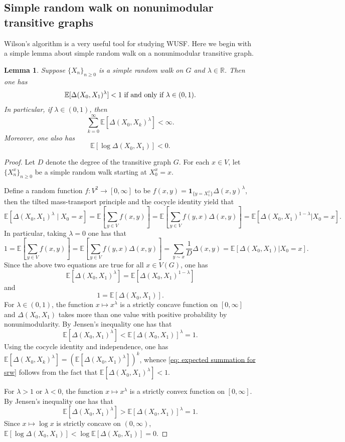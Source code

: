 \documentclass[12pt]{article}
\newtheorem{lemma}[theorem]{Lemma}
\numberwithin{equation}{section}
\newcommand{\be}{\begin{equation}}
\newcommand{\ee}{\end{equation}}
\newcommand{\1}{\mathbf{1}}
\begin{document}
 
 \subsection{Simple random walk on nonunimodular transitive graphs}
 Wilson's algorithm is a very useful tool for studying WUSF. Here we begin with a simple lemma about simple random walk on a nonunimodular transitive graph. 
 \begin{lemma}\label{lem:expectation for SRW on nonunimodular transitive graph}
 	Suppose $\{X_n\}_{n\geq0}$ is a simple random walk on $G$ and $\lambda\in\mathbb{R}$. Then one has 
 	\[
 	\mathbb{E}[\Delta(X_0,X_1)^\lambda]<1 \textnormal{ if and only if }\lambda\in(0,1).
 	\]
 	In particular, if $\lambda\in(0,1)$, then 
 	\be\label{eq: expected summation for srw}
 	\sum_{k=0}^{\infty}\mathbb{E}[\Delta(X_0,X_k)^\lambda]<\infty.
 	\ee
 	Moreover, one also has 
 	\[
 	\mathbb{E}[\log\Delta(X_0,X_1)]<0.
 	\]
 \end{lemma}
 \begin{proof}
 	Let $D$ denote the degree of the transitive graph $G$. For  each $x\in V$, let $\{X_n^x\}_{n\geq0}$ be a simple random walk starting at $X_0^x=x$.
 	
 	Define a random function $f:V^2\rightarrow[0,\infty]$ to be $f(x,y)=\mathbf{1}_{\{y=X_1^x\}}\Delta(x,y)^\lambda$, then the tilted mass-transport principle and the cocycle identity yield that 
 	\[
 	\mathbb{E}[\Delta(X_0,X_1)^\lambda\mid X_0=x]=\mathbb{E}[\sum_{y\in V}f(x,y)]=\mathbb{E}[\sum_{y\in V}f(y,x)\Delta(x,y) ]=	\mathbb{E}[\Delta(X_0,X_1)^{1-\lambda}|X_0=x].
 	\]
 	In particular, taking $\lambda=0$ one has that 
 	\[
 	1=\mathbb{E}[\sum_{y\in V}f(x,y)]=\mathbb{E}[\sum_{y\in V}f(y,x)\Delta(x,y) ]=\sum_{y\sim x}\frac{1}{D}\Delta(x,y)=\mathbb{E}[\Delta(X_0,X_1)|X_0=x].
 	\]
  Since the above two equations are true for all $x\in V(G)$, one has
  \[
  	\mathbb{E}[\Delta(X_0,X_1)^\lambda]=\mathbb{E}[\Delta(X_0,X_1)^{1-\lambda}]
  \]
 	and
 	\[
 	1=\mathbb{E}[\Delta(X_0,X_1)].
 	\]
 	For $\lambda\in (0,1)$, the function $x\mapsto x^\lambda$ is a strictly concave function on $[0,\infty]$ and  $\Delta(X_0,X_1)$ takes more than one value with positive probability by  nonunimodularity. By Jensen's inequality one has that 
 	\[
 	\mathbb{E}[\Delta(X_0,X_1)^\lambda]<\mathbb{E}[\Delta(X_0,X_1)]^\lambda=1.
 	\]
 	Using the cocycle identity and independence, one has $\mathbb{E}[\Delta(X_0,X_k)^\lambda]=\left(\mathbb{E}[\Delta(X_0,X_1)^\lambda]\right)^k$, whence \eqref{eq: expected summation for srw} follows from the fact that $\mathbb{E}[\Delta(X_0,X_1)^\lambda]<1$.
 	
 	For $\lambda>1$ or $\lambda<0$, the  function $x\mapsto x^\lambda$ is a strictly convex function on $[0,\infty]$. By Jensen's inequality one has that 
 	\[
 	\mathbb{E}[\Delta(X_0,X_1)^\lambda]>\mathbb{E}[\Delta(X_0,X_1)]^\lambda=1.
 	\]
 Since $x\mapsto \log x$ is  strictly concave on $(0,\infty)$,	$\mathbb{E}[\log\Delta(X_0,X_1)]<\log\mathbb{E}[\Delta(X_0,X_1)]=0.$\end{proof}
\end{document}
